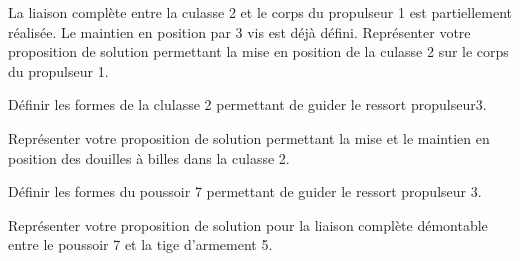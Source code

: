 \documentclass[11pt]{article}
\begin{document}
\UPSTIquestion* La liaison complète entre la culasse 2 et le corps du propulseur 1 est partiellement réalisée. Le maintien en position par 3 vis est déjà défini. Représenter votre proposition de solution permettant la mise en position de la culasse 2 sur le corps du propulseur 1. 
\begin{UPSTIcorrige}
\end{UPSTIcorrige}

\UPSTIquestion Définir les formes de la clulasse 2 permettant de guider le ressort propulseur3.
\begin{UPSTIcorrige}
\end{UPSTIcorrige}

\UPSTIquestion Représenter votre proposition de solution permettant la mise et le maintien en position des douilles à billes dans la culasse 2. 
\begin{UPSTIcorrige}
\end{UPSTIcorrige}

\UPSTIquestion Définir les formes du poussoir 7 permettant de guider le ressort propulseur 3.

 Représenter votre proposition de solution pour la liaison complète démontable entre le poussoir 7 et la tige d'armement 5. 
\begin{UPSTIcorrige}
\end{UPSTIcorrige}


\end{document}
